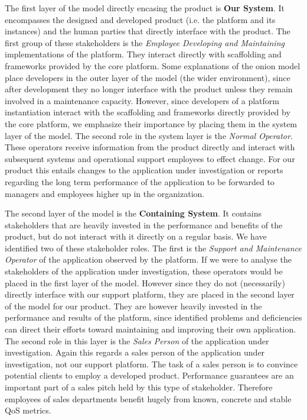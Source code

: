 The first layer of the model directly encasing the product is \textbf{Our System}. It encompasses the designed and developed product (i.e. the platform and its instances) and the human parties that directly interface with the product. The first group of these stakeholders is the \emph{Employee Developing and Maintaining} implementations of the platform. They interact directly with scaffolding and frameworks provided by the core platform. Some explanations of the onion model place developers in the outer layer of the model (the wider environment), since after development they no longer interface with the product unless they remain involved in a maintenance capacity. However, since developers of a platform instantiation interact with the scaffolding and frameworks directly provided by the core platform, we emphasize their importance by placing them in the system layer of the model. The second role in the system layer is the \emph{Normal Operator}. These operators receive information from the product directly and interact with subsequent systems and operational support employees to effect change. For our product this entails changes to the application under investigation or reports regarding the long term performance of the application to be forwarded to managers and employees higher up in the organization.

The second layer of the model is the \textbf{Containing System}. It contains stakeholders that are heavily invested in the performance and benefits of the product, but do not interact with it directly on a regular basis. We have identified two of these stakeholder roles. The first is the \emph{Support and Maintenance Operator} of the application observed by the platform. If we were to analyse the stakeholders of the application under investigation, these operators would be placed in the first layer of the model. However since they do not (necessarily) directly interface with our support platform, they are placed in the second layer of the model for our product. They are however heavily invested in the performance and results of the platform, since identified problems and deficiencies can direct their efforts toward maintaining and improving their own application. The second role in this layer is the \emph{Sales Person} of the application under investigation. Again this regards a sales person of the application under investigation, not our support platform. The task of a sales person is to convince potential clients to employ a developed product. Performance guarantees are an important part of a sales pitch held by this type of stakeholder. Therefore employees of sales departments benefit hugely from known, concrete and stable QoS metrics.

